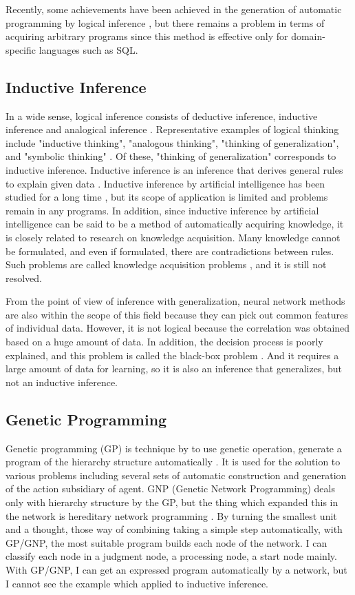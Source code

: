 \documentclass{article}
\begin{document}
Recently, some achievements have been achieved in the generation of automatic programming by logical inference \cite{palsql}, but there remains a problem in terms of acquiring arbitrary programs since this method is effective only for domain-specific languages such as SQL.

\subsection {Inductive Inference}
In a wide sense, logical inference consists of deductive inference, inductive inference and analogical inference \cite{math300}.
Representative examples of logical thinking include "inductive thinking", "analogous thinking", "thinking of generalization", and "symbolic thinking" \cite{saito:11}.
Of these, "thinking of generalization" corresponds to inductive inference.
Inductive inference is an inference that derives general rules to explain given data \cite {inductive-reasoning}.
Inductive inference by artificial intelligence has been studied for a long time \cite{CASE1983193}\cite{4767034}, but its scope of application is limited and problems remain in any programs.
In addition, since inductive inference by artificial intelligence can be said to be a method of automatically acquiring knowledge, it is closely related to research on knowledge acquisition.
Many knowledge cannot be formulated, and even if formulated, there are contradictions between rules. Such problems are called knowledge acquisition problems \cite{KnowledgeAI}\cite{KAIssues}, and it is still not resolved.

From the point of view of inference with generalization, neural network methods are also within the scope of this field because they can pick out common features of individual data.
However, it is not logical because the correlation was obtained based on a huge amount of data.
In addition, the decision process is poorly explained, and this problem is called the black-box problem \cite{BlackBoxProblem}.
And it requires a large amount of data for learning, so it is also an inference that generalizes, but not an inductive inference.

\subsection {Genetic Programming}
Genetic programming (GP) is technique by to use genetic operation, generate a program of the hierarchy structure automatically \cite{Koza1994}.
It is used for the solution to various problems including several sets of automatic construction and generation of the action subsidiary of agent.
GNP (Genetic Network Programming) deals only with hierarchy structure by the GP, but the thing which expanded this in the network is hereditary network programming \cite{gnp}.
By turning the smallest unit and a thought, those way of combining taking a simple step automatically, with GP/GNP, the most suitable program builds each node of the network.
I can classify each node in a judgment node, a processing node, a start node mainly.
With GP/GNP, I can get an expressed program automatically by a network, but I cannot see the example which applied to inductive inference.
\end{document}
